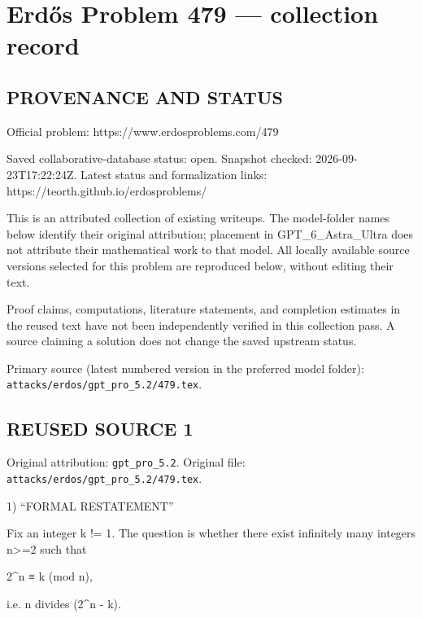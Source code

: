 \section*{Erd\H{o}s Problem 479 --- collection record}

\subsection*{PROVENANCE AND STATUS}
Official problem: https://www.erdosproblems.com/479

Saved collaborative-database status: open.
Snapshot checked: 2026-09-23T17:22:24Z.
Latest status and formalization links: https://teorth.github.io/erdosproblems/

This is an attributed collection of existing writeups. The model-folder names below identify their original attribution; placement in GPT\_6\_Astra\_Ultra does not attribute their mathematical work to that model. All locally available source versions selected for this problem are reproduced below, without editing their text.

Proof claims, computations, literature statements, and completion estimates in the reused text have not been independently verified in this collection pass. A source claiming a solution does not change the saved upstream status.

Primary source (latest numbered version in the preferred model folder): \texttt{attacks/erdos/gpt\_pro\_5.2/479.tex}.

\subsection*{REUSED SOURCE 1}
Original attribution: \texttt{gpt\_pro\_5.2}.
Original file: \texttt{attacks/erdos/gpt\_pro\_5.2/479.tex}.


1) “FORMAL RESTATEMENT”

Fix an integer k != 1. The question is whether there exist infinitely many integers n>=2 such that

    2^n ≡ k (mod n),

i.e. n divides (2^n - k).

